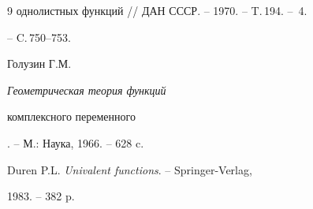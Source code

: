 \begin{thebibliography}{9}
{однолистных функций} // ДАН СССР. -- 1970. -- T.\,194. -- \No\,4.


-- C.\,750--753.







Голузин Г.М. {\em Геометрическая теория функций


комплексного переменного}. -- М.: Наука, 1966. -- 628 c.







Duren P.L. {\em Univalent functions}. -- Springer-Verlag,


1983. -- 382 p.





\end{thebibliography}





\vskip 2cm












\label{end}








